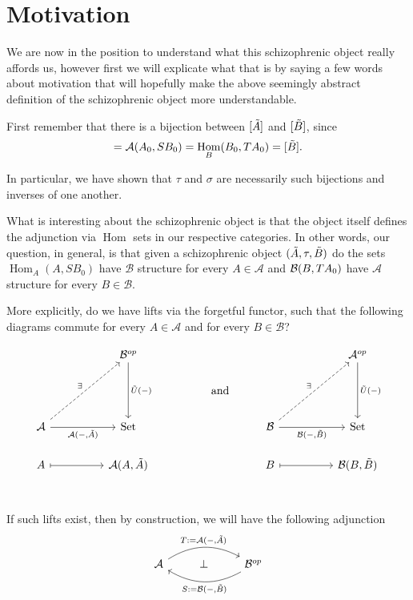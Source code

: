 \documentclass[12pt,a4paper]{article}
\DeclareMathOperator{\Hom}{Hom}
\DeclareMathOperator{\Set}{Set}
\def\HomA{\ensuremath\mathcal{A}}
\def\HomB{\ensuremath\mathcal{B}}
\def\t{\ensuremath\tilde}
\begin{document}
\section{Motivation}
We are now in the position to understand what this schizophrenic object really affords us, however first we will explicate what that is by  saying a few words about motivation that will hopefully make the above seemingly abstract definition of the schizophrenic object more understandable. 

First remember that there is a bijection between $[\t A]$ and $[\t B]$, since  \begin{align*}
	[\t A] = \HomA(A_0, SB_0) = \Hom_B(B_0, TA_0) = [\t B].
\end{align*}

In particular, we have shown that $\tau$ and $\sigma$ are necessarily such bijections and inverses of one another. 

What is interesting about the schizophrenic object is that the object itself defines the adjunction via $\Hom$ sets in our respective categories. In other words, our question, in general, is that given a schizophrenic object $(\t A, \tau, \t B)$ do the sets $\Hom_A(A, SB_0)$ have $\mathcal{B}$ structure for every $A \in \mathcal{A}$ and $\HomB(B, TA_0)$ have $\mathcal{A}$ structure for every $B \in \mathcal{B}$. 

More explicitly, do we have lifts via the forgetful functor, such that the following diagrams commute for every $A \in \mathcal{A}$ and for every $B \in \mathcal{B}$?

\[\begin{tikzcd}
	&& {\mathcal{B}^{op}} &&&&& {\mathcal{A}^{op}} \\
	&& {} && {\text{and}} \\
	{\mathcal{A}} && \Set &&& {\mathcal{B}} && \Set \\
	A && {\HomA(A, \t A)} &&& B && {\HomB(B, \t B)} \\
	&&&&& {}
	\arrow["{\t U(-)}", from=1-3, to=3-3]
	\arrow["{\t U(-)}", from=1-8, to=3-8]
	\arrow["\exists", dashed, from=3-1, to=1-3]
	\arrow["{\HomA(-,\t A)}"', from=3-1, to=3-3]
	\arrow["\exists", dashed, from=3-6, to=1-8]
	\arrow["{\HomB(-,\t B)}"', from=3-6, to=3-8]
	\arrow[maps to, from=4-1, to=4-3]
	\arrow[maps to, from=4-6, to=4-8]
\end{tikzcd}\]
If such lifts exist, then by construction, we will have the following adjunction
\[\begin{tikzcd}
	{\mathcal{A}} & \bot & {\mathcal{B}^{op}}
	\arrow["{T:=\HomA(-, \t A)}",  bend left, from=1-1, to=1-3, from=1-1, to=1-3]
	\arrow["{S:=\HomB(-, \t B)}", bend left, from=1-3, to=1-1, from=1-3, to=1-1]
\end{tikzcd}\]
\end{document}
